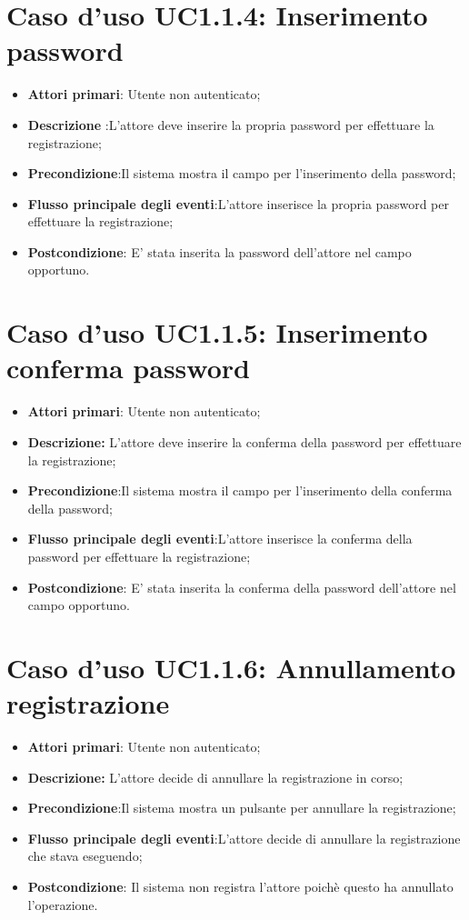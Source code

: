 		\section{Caso d'uso UC1.1.4: Inserimento password}
		\begin{itemize}
			\item \textbf{Attori primari}: Utente non autenticato;
			\item \textbf{Descrizione} :L'attore deve inserire la propria password per effettuare la registrazione;
			\item \textbf{Precondizione}:Il sistema mostra il campo per l'inserimento della password;
			\item \textbf{Flusso principale degli eventi}:L'attore inserisce la propria password per effettuare la registrazione;
			\item \textbf{Postcondizione}: E' stata inserita la password dell'attore nel campo opportuno.
		\end{itemize}
		\section{Caso d'uso UC1.1.5: Inserimento conferma password}
		\begin{itemize}
			\item \textbf{Attori primari}: Utente non autenticato;
			\item \textbf{Descrizione:} L'attore deve inserire la conferma della password per effettuare la registrazione;
			\item \textbf{Precondizione}:Il sistema mostra il campo per l'inserimento della conferma della password;
			\item \textbf{Flusso principale degli eventi}:L'attore inserisce la conferma della password per effettuare la registrazione;
			\item \textbf{Postcondizione}: E' stata inserita la conferma della password dell'attore nel campo opportuno.
		\end{itemize}
		\section{Caso d'uso UC1.1.6: Annullamento registrazione}
		\begin{itemize}
			\item \textbf{Attori primari}: Utente non autenticato;
			\item \textbf{Descrizione:} L'attore decide di annullare la registrazione in corso;
			\item \textbf{Precondizione}:Il sistema mostra un pulsante per annullare la  registrazione;
			\item \textbf{Flusso principale degli eventi}:L'attore decide di annullare la registrazione che stava eseguendo;
			\item \textbf{Postcondizione}: Il sistema non registra l'attore poichè questo ha annullato l'operazione.
		\end{itemize}
